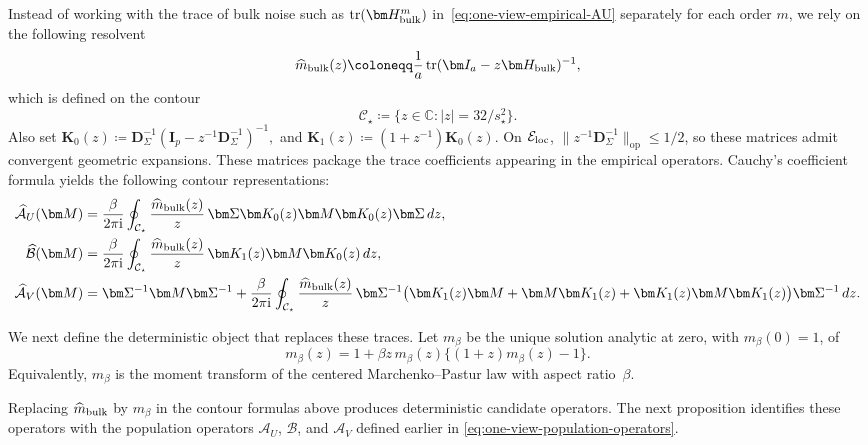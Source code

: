 \documentclass[11pt]{article}
\newcommand{\C}{\mathbb{C}}
\DeclareMathOperator{\tr}{tr}
\newcommand{\cE}{\mathcal{E}}
\begin{document}
Instead of working with the trace of bulk noise such as $\tr(\bm H_{\rm bulk}^{m})$ in~\cref{eq:one-view-empirical-AU} separately for each order $m$, we rely on the following resolvent 
\[
\widehat m_{\rm bulk}(z) \coloneqq \frac1a \tr(\bm I_a-z\bm H_{\rm bulk})^{-1},
\]
which is defined on the contour
\[
\mathcal C_\star
\coloneqq
\{z\in\C:|z|=32/s_\star^2\}.
\]
Also set
$\bm K_0(z) \coloneqq \bm D_\Sigma^{-1} \left( \bm I_p-z^{-1}\bm D_\Sigma^{-1} \right)^{-1},$ and $ \bm K_1(z) \coloneqq (1+z^{-1})\bm K_0(z).$
On $\cE_{\rm loc}$,
$\|z^{-1}\bm D_\Sigma^{-1}\|_{\mathrm{op}}\le1/2$, so these matrices admit
convergent geometric expansions.
These matrices package the trace coefficients appearing in the empirical
operators.  Cauchy's coefficient formula yields the following contour
representations:
\begin{subequations}
\label{eq:one-view-empirical-contours}
\begin{align}
  \widehat{\mathcal A}_U(\bm M)
  &=
  \frac{\beta}{2\pi\mathrm i}
  \oint_{\mathcal C_\star}
  \frac{\widehat m_{\rm bulk}(z)}{z}\,
  \bm\Sigma\bm K_0(z)
  \bm M
  \bm K_0(z)\bm\Sigma\,dz,
  \label{eq:one-view-empirical-AU-contour}\\
  \widehat{\mathcal B}(\bm M)
  &=
  \frac{\beta}{2\pi\mathrm i}
  \oint_{\mathcal C_\star}
  \frac{\widehat m_{\rm bulk}(z)}{z}\,
  \bm K_1(z)\bm M\bm K_0(z)\,dz,
  \label{eq:one-view-empirical-B-contour}\\
  \widehat{\mathcal A}_V(\bm M)
  &=
  \bm\Sigma^{-1}\bm M\bm\Sigma^{-1}
  +
  \frac{\beta}{2\pi\mathrm i}
  \oint_{\mathcal C_\star}
  \frac{\widehat m_{\rm bulk}(z)}{z}\,
  \bm\Sigma^{-1}
  \bigl(
    \bm K_1(z)\bm M
    +
    \bm M\bm K_1(z)
    +
    \bm K_1(z)\bm M\bm K_1(z)
  \bigr)
  \bm\Sigma^{-1}\,dz.
  \label{eq:one-view-empirical-AV-contour}
\end{align}
\end{subequations}



We next define the deterministic object that replaces these traces.
Let $m_\beta$ be the unique solution analytic at zero, with
$m_\beta(0)=1$, of
\begin{equation}
\label{eq:one-view-MP-equation}
  m_\beta(z)
  =
  1
  +
  \beta z\,m_\beta(z)
  \bigl\{
    (1+z)m_\beta(z)-1
  \bigr\}.
\end{equation}
Equivalently, $m_\beta$ is the moment transform of the centered
Marchenko--Pastur law with aspect ratio~$\beta$.  

Replacing $\widehat m_{\rm bulk}$ by $m_\beta$ in the contour formulas above produces
deterministic candidate operators.  The next proposition identifies these
operators with the population operators
$\mathcal A_U$, $\mathcal B$, and $\mathcal A_V$ defined earlier in
\cref{eq:one-view-population-operators}.
\end{document}
